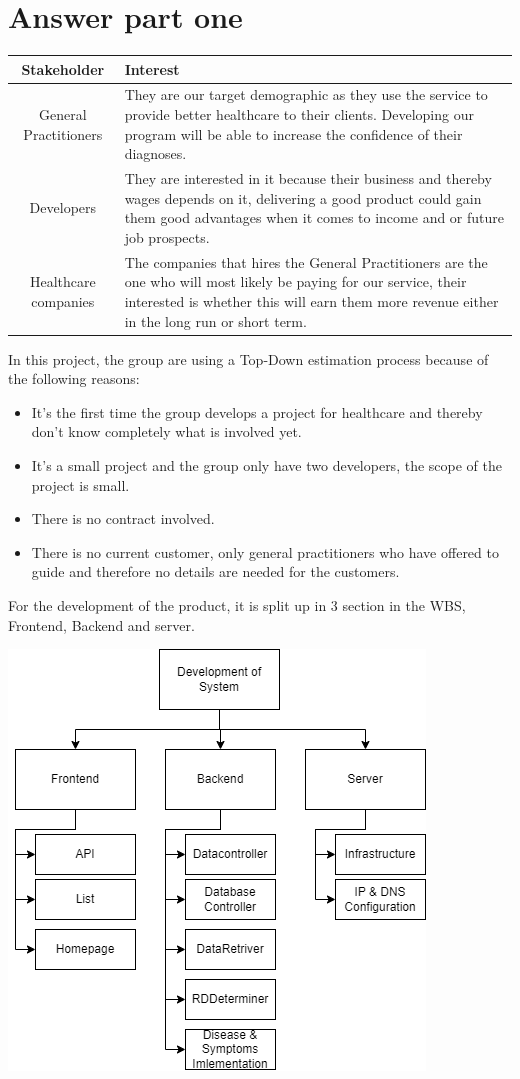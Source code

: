 \section{Answer part one}
\begin{center}
	\begin{tabular}[h]{|c|p{25em}|}
		\hline
		Stakeholder & Interest \\ \hline
		General Practitioners & They are our target demographic as they use the service to provide better healthcare to their clients. Developing our program will be able to increase the confidence of their diagnoses. \\ \hline
		Developers & They are interested in it because their business and thereby wages depends on it, delivering a good product could gain them good advantages when it comes to income and or future job prospects. \\ \hline
		Healthcare companies & The companies that hires the General Practitioners are the one who will most likely be paying for our service, their interested is whether this will earn them more revenue either in the long run or short term.\\ \hline
	\end{tabular}
\end{center}

In this project, the group are using a Top-Down estimation process because of the following reasons:
\begin{itemize}
	\item It's the first time the group develops a project for healthcare and thereby don't know completely what is involved yet.
	\item It's a small project and the group only have two developers, the scope of the project is small.
	\item There is no contract involved.
	\item There is no current customer, only general practitioners who have offered to guide and therefore no details are needed for the customers.
\end{itemize}
For the development of the product, it is split up in 3 section in the WBS, Frontend, Backend and server. 
\begin{center}
	\includegraphics[width=.5\columnwidth]{./WBS}
\end{center}

